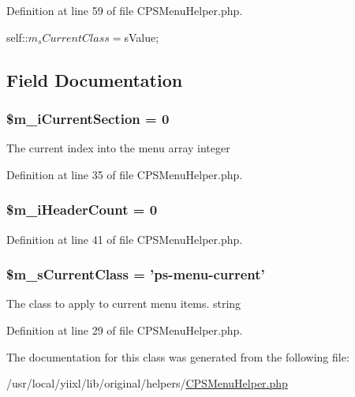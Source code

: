 Definition at line 59 of file CPSMenuHelper.php.




\begin{DoxyCode}
{ self::$m_sCurrentClass = $sValue; }
\end{DoxyCode}




\subsection{Field Documentation}
\hypertarget{classCPSMenuHelper_ab6bcd8d2a1b21bcdeeb554a76305637e}{
\subsubsection[{\$m\_\-iCurrentSection}]{\setlength{\rightskip}{0pt plus 5cm}\$m\_\-iCurrentSection = 0}}
\label{classCPSMenuHelper_ab6bcd8d2a1b21bcdeeb554a76305637e}
The current index into the menu array  integer 

Definition at line 35 of file CPSMenuHelper.php.

\hypertarget{classCPSMenuHelper_ae2b5f115567bf9c7d2603846b88cff51}{
\subsubsection[{\$m\_\-iHeaderCount}]{\setlength{\rightskip}{0pt plus 5cm}\$m\_\-iHeaderCount = 0}}
\label{classCPSMenuHelper_ae2b5f115567bf9c7d2603846b88cff51}


Definition at line 41 of file CPSMenuHelper.php.

\hypertarget{classCPSMenuHelper_acc409b01c46f516da036994427bb80a2}{
\subsubsection[{\$m\_\-sCurrentClass}]{\setlength{\rightskip}{0pt plus 5cm}\$m\_\-sCurrentClass = 'ps-\/menu-\/current'}}
\label{classCPSMenuHelper_acc409b01c46f516da036994427bb80a2}
The class to apply to current menu items.  string 

Definition at line 29 of file CPSMenuHelper.php.



The documentation for this class was generated from the following file:\begin{DoxyCompactItemize}
\item 
/usr/local/yiixl/lib/original/helpers/\hyperlink{CPSMenuHelper_8php}{CPSMenuHelper.php}\end{DoxyCompactItemize}
